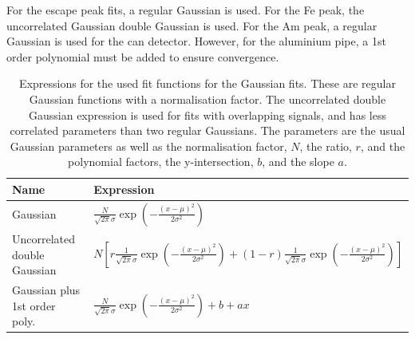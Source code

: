 For the escape peak fits, a regular Gaussian is used. For the Fe peak, the uncorrelated Gaussian double Gaussian is used. For the Am peak, a regular Gaussian is used for the can detector. However, for the aluminium pipe, a 1st order polynomial must be added to ensure convergence.

\begin{table}[htb!]
\begin{tabular}{ll}
\textbf{Name}                 & \textbf{Expression} \\ \hline
Gaussian                      & $\frac{N}{\sqrt{2\pi}\sigma}\exp{\left(-\frac{\left(x-\mu\right)^2}{2\sigma^2}\right)}$                    \\
Uncorrelated double Gaussian  & $N\left[r\frac{1}{\sqrt{2\pi}\sigma}\exp{\left(-\frac{\left(x-\mu\right)^2}{2\sigma^2}\right)}+(1-r)\frac{1}{\sqrt{2\pi}\sigma}\exp{\left(-\frac{\left(x-\mu\right)^2}{2\sigma^2}\right)}\right]$                     \\
Gaussian plus 1st order poly. & $\frac{N}{\sqrt{2\pi}\sigma}\exp{\left(-\frac{\left(x-\mu\right)^2}{2\sigma^2}\right)} + b + ax$                   
\end{tabular}
\caption{Expressions for the used fit functions for the Gaussian fits. These are regular Gaussian functions with a normalisation factor. The uncorrelated double Gaussian expression is used for fits with overlapping signals, and has less correlated parameters than two regular Gaussians. The parameters are the usual Gaussian parameters as well as the normalisation factor, $N$, the ratio, $r$, and the polynomial factors, the y-intersection, $b$, and the slope $a$.}
\label{tab:fitfuncchannelfits}
\end{table}

